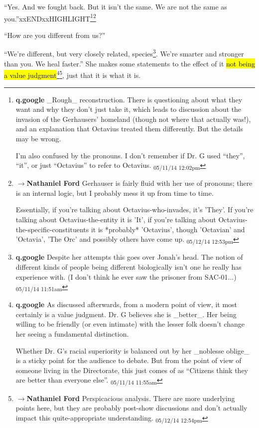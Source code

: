 ``Yes.  And we fought back.  But it isn't the same.  We are not the same as you.''xxENDxxHIGHLIGHT\footnote{\textbf{q.google }\_Rough\_ reconstruction.  There is questioning about what they want and why they don't just take it, which leads to discussion about the invasion of the Gerhausers' homeland (though not where that actually was!), and an explanation that Octavius treated them differently.  But the details may be wrong.

I'm also confused by the pronouns.  I don't remember if Dr. G used ``they'', ``it'', or just ``Octavius'' to refer to Octavius. \textsubscript{05/11/14 12:02pm}}\footnote{$\rightarrow$\textbf{Nathaniel Ford }Gerhauser is fairly fluid with her use of pronouns; there is an internal logic, but I probably mess it up from time to time.

Essentially, if you're talking about Octavius-who-invades, it's 'They'. If you're talking about Octavius-the-entity it is 'It', if you're talking about Octavius-the-specific-constituents it is *probably* 'Octavius', though 'Octavian' and 'Octavia', 'The Orc' and possibly others have come up. \textsubscript{05/12/14 12:53pm}}

``How are you different from us?''

``We're different, but very closely related, species\footnote{\textbf{q.google }Despite her attempts this goes over Jonah's head.  The notion of different kinds of people being different biologically isn't one he really has experience with.  (I don't think he ever saw the prisoner from SAC-01...) \textsubscript{05/11/14 11:51am}}.  We're smarter and stronger than you.  We heal faster.''  She makes some statements to the effect of it \hl{not being a value judgment}\footnote{\textbf{q.google }As discussed afterwards, from a modern point of view, it most certainly is a value judgment.  Dr. G believes she is \_better\_.  Her being willing to be friendly (or even intimate) with the lesser folk doesn't change her seeing a fundamental distinction.

Whether Dr. G's racial superiority is balanced out by her \_noblesse oblige\_ is a sticky point for the audience to debate.  But from the point of view of someone living in the Directorate, this just comes of as ``Citizens think they are better than everyone else''. \textsubscript{05/11/14 11:55am}}\footnote{$\rightarrow$\textbf{Nathaniel Ford }Perspicacious analysis. There are more underlying points here, but they are probably post-show discussions and don't actually impact this quite-appropriate understanding. \textsubscript{05/12/14 12:54pm}}, just that it is what it is.

